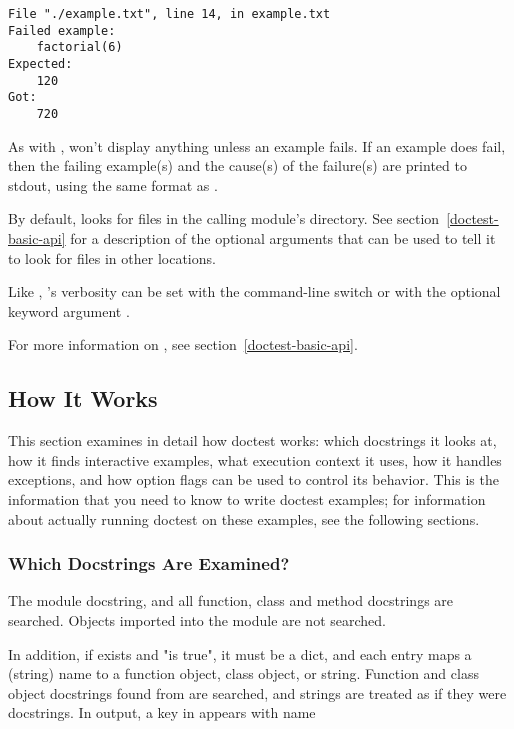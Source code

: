 \begin{verbatim}
File "./example.txt", line 14, in example.txt
Failed example:
    factorial(6)
Expected:
    120
Got:
    720
\end{verbatim}

As with ,  won't display anything
unless an example fails.  If an example does fail, then the failing
example(s) and the cause(s) of the failure(s) are printed to stdout, using
the same format as .

By default,  looks for files in the calling
module's directory.  See section~\ref{doctest-basic-api} for a
description of the optional arguments that can be used to tell it to
look for files in other locations.

Like , 's verbosity can be
set with the  command-line switch or with the optional
keyword argument .

For more information on , see
section~\ref{doctest-basic-api}.

\subsection{How It Works\label{doctest-how-it-works}}

This section examines in detail how doctest works: which docstrings it
looks at, how it finds interactive examples, what execution context it
uses, how it handles exceptions, and how option flags can be used to
control its behavior.  This is the information that you need to know
to write doctest examples; for information about actually running
doctest on these examples, see the following sections.

\subsubsection{Which Docstrings Are Examined?\label{doctest-which-docstrings}}

The module docstring, and all function, class and method docstrings are
searched.  Objects imported into the module are not searched.

In addition, if  exists and "is true", it must be a
dict, and each entry maps a (string) name to a function object, class
object, or string.  Function and class object docstrings found from
 are searched, and strings are treated as if they
were docstrings.  In output, a key  in  appears
with name

